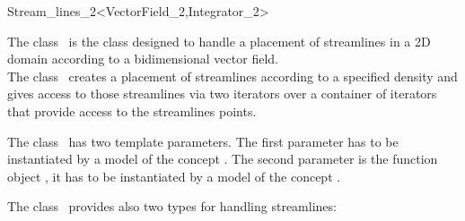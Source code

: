 

\ccModifierCrossRefOff
\begin{ccRefClass}{Stream_lines_2<VectorField_2,Integrator_2>}  %


\ccDefinition
  
The class \ccRefName\ is the class designed to handle a placement of
streamlines in a 2D domain according to a bidimensional vector
field.\\
The class \ccRefName\  creates a placement of streamlines according to a 
specified density and gives access to those streamlines via two
iterators over a container of iterators that provide access to the
streamlines points.

\ccParameters
The class \ccRefName\ has two template parameters. The first parameter
 has to be instantiated by a model of the concept
. The second parameter is the function object
, it has to be instantiated by a model of the concept
.

\ccTypes
{}
\ccGlue
{}
\ccGlue
{}
\ccGlue
{}

The class \ccRefName\ provides also two types for handling
streamlines:

\ccGlue
{}
\ccGlue




\end{ccRefClass}
